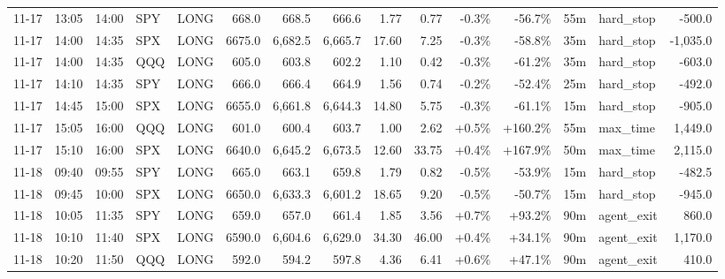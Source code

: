 \documentclass[11pt,a4paper,twoside]{article}
\begin{document}
\begin{landscape}
\begin{center}
\begin{longtable}{>{\color{txtmain}}l l l l l r r r r r r r r >{\color{txtmain}}l r}
11-17 & 13:05 & 14:00 & SPY & LONG & 668.0 & 668.5 & 666.6 & 1.77 & 0.77 & \textcolor{lossred}{-0.3\%} & \textcolor{lossred}{-56.7\%} & 55m & hard\_stop & \textcolor{lossred}{-500.0} \\
11-17 & 14:00 & 14:35 & SPX & LONG & 6675.0 & 6,682.5 & 6,665.7 & 17.60 & 7.25 & \textcolor{lossred}{-0.3\%} & \textcolor{lossred}{-58.8\%} & 35m & hard\_stop & \textcolor{lossred}{-1,035.0} \\
11-17 & 14:00 & 14:35 & QQQ & LONG & 605.0 & 603.8 & 602.2 & 1.10 & 0.42 & \textcolor{lossred}{-0.3\%} & \textcolor{lossred}{-61.2\%} & 35m & hard\_stop & \textcolor{lossred}{-603.0} \\
11-17 & 14:10 & 14:35 & SPY & LONG & 666.0 & 666.4 & 664.9 & 1.56 & 0.74 & \textcolor{lossred}{-0.2\%} & \textcolor{lossred}{-52.4\%} & 25m & hard\_stop & \textcolor{lossred}{-492.0} \\
11-17 & 14:45 & 15:00 & SPX & LONG & 6655.0 & 6,661.8 & 6,644.3 & 14.80 & 5.75 & \textcolor{lossred}{-0.3\%} & \textcolor{lossred}{-61.1\%} & 15m & hard\_stop & \textcolor{lossred}{-905.0} \\
11-17 & 15:05 & 16:00 & QQQ & LONG & 601.0 & 600.4 & 603.7 & 1.00 & 2.62 & \textcolor{wingreen}{+0.5\%} & \textcolor{wingreen}{+160.2\%} & 55m & max\_time & \textcolor{wingreen}{1,449.0} \\
11-17 & 15:10 & 16:00 & SPX & LONG & 6640.0 & 6,645.2 & 6,673.5 & 12.60 & 33.75 & \textcolor{wingreen}{+0.4\%} & \textcolor{wingreen}{+167.9\%} & 50m & max\_time & \textcolor{wingreen}{2,115.0} \\
11-18 & 09:40 & 09:55 & SPY & LONG & 665.0 & 663.1 & 659.8 & 1.79 & 0.82 & \textcolor{lossred}{-0.5\%} & \textcolor{lossred}{-53.9\%} & 15m & hard\_stop & \textcolor{lossred}{-482.5} \\
11-18 & 09:45 & 10:00 & SPX & LONG & 6650.0 & 6,633.3 & 6,601.2 & 18.65 & 9.20 & \textcolor{lossred}{-0.5\%} & \textcolor{lossred}{-50.7\%} & 15m & hard\_stop & \textcolor{lossred}{-945.0} \\
11-18 & 10:05 & 11:35 & SPY & LONG & 659.0 & 657.0 & 661.4 & 1.85 & 3.56 & \textcolor{wingreen}{+0.7\%} & \textcolor{wingreen}{+93.2\%} & 90m & agent\_exit & \textcolor{wingreen}{860.0} \\
11-18 & 10:10 & 11:40 & SPX & LONG & 6590.0 & 6,604.6 & 6,629.0 & 34.30 & 46.00 & \textcolor{wingreen}{+0.4\%} & \textcolor{wingreen}{+34.1\%} & 90m & agent\_exit & \textcolor{wingreen}{1,170.0} \\
11-18 & 10:20 & 11:50 & QQQ & LONG & 592.0 & 594.2 & 597.8 & 4.36 & 6.41 & \textcolor{wingreen}{+0.6\%} & \textcolor{wingreen}{+47.1\%} & 90m & agent\_exit & \textcolor{wingreen}{410.0} \\

\end{longtable}
\end{center}
\end{landscape}
\end{document}
